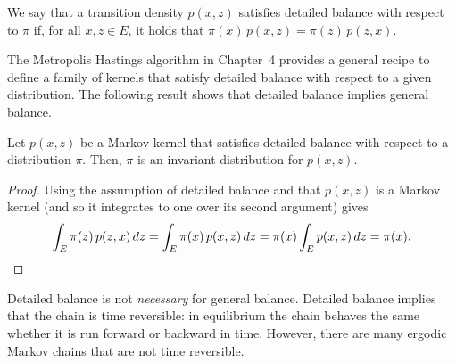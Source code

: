 \begin{definition}
\label{def:A.10}
We say that a transition density $p(x, z)$ satisfies detailed balance with respect to $\pi$ if,
for all $x, z \in E$, it holds that $\pi(x)\, p(x, z) = \pi(z)\, p(z, x)$.
\end{definition}

The Metropolis Hastings algorithm in Chapter~4 provides a general recipe to define a family of
kernels that satisfy detailed balance with respect to a given distribution.  The following result
shows that detailed balance implies general balance.

\begin{theorem}
\label{thm:A.11}
Let $p(x, z)$ be a Markov kernel that satisfies detailed balance with respect to a distribution
$\pi$.  Then, $\pi$ is an invariant distribution for $p(x, z)$.
\end{theorem}

\begin{proof}
Using the assumption of detailed balance and that $p(x, z)$ is a Markov kernel (and so it
integrates to one over its second argument) gives
\[
  \int_E \pi(z)\, p(z, x)\, dz
  = \int_E \pi(x)\, p(x, z)\, dz
  = \pi(x) \int_E p(x, z)\, dz
  = \pi(x). \qedhere
\]
\end{proof}

\begin{remark}
\label{rem:A.12}
Detailed balance is not \emph{necessary} for general balance.  Detailed balance implies that the
chain is time reversible: in equilibrium the chain behaves the same whether it is run forward or
backward in time.  However, there are many ergodic Markov chains that are not time reversible.
\end{remark}

